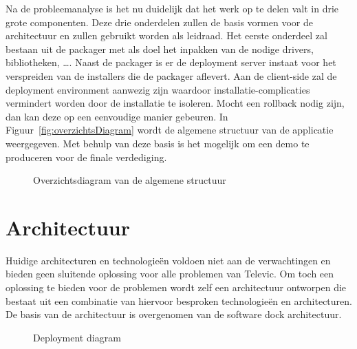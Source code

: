 Na de probleemanalyse is het nu duidelijk dat het werk op te delen valt in drie grote componenten.
Deze drie onderdelen zullen de basis vormen voor de architectuur en zullen gebruikt worden als leidraad.
Het eerste onderdeel zal bestaan uit de packager met als doel het inpakken van de nodige drivers, bibliotheken, \ldots .
Naast de packager is er de deployment server instaat voor het verspreiden van de installers die de packager aflevert.
Aan de client-side zal de deployment environment aanwezig zijn waardoor installatie-complicaties vermindert worden door de installatie te isoleren.
Mocht een rollback nodig zijn, dan kan deze op een eenvoudige manier gebeuren.
In Figuur~\vref{fig:overzichtsDiagram} wordt de algemene structuur van de applicatie weergegeven.
Met behulp van deze basis is het mogelijk om een demo te produceren voor de finale verdediging.

\begin{figure}[!hbt]
\centering
  
  \caption{Overzichtsdiagram van de algemene structuur}
  \label{fig:overzichtsDiagram}
\end{figure}

\section{Architectuur}
Huidige architecturen en technologieën voldoen niet aan de verwachtingen en bieden geen sluitende oplossing voor alle problemen van Televic.
Om toch een oplossing te bieden voor de problemen wordt zelf een architectuur ontworpen die bestaat uit een combinatie van hiervoor besproken technologieën en architecturen.
De basis van de architectuur is overgenomen van de software dock architectuur.

\begin{figure}[!ht]
\centering
{}
\caption{Deployment diagram}
\label{fig:deploymentDiagram}
\end{figure}

